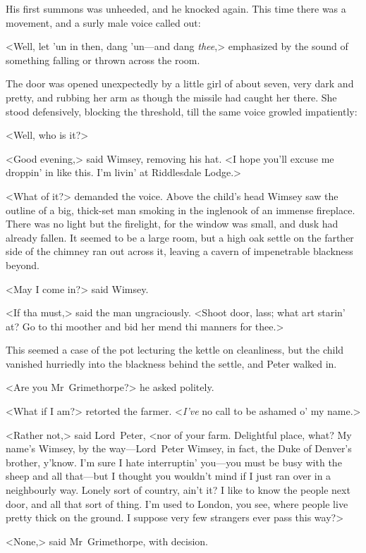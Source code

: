 His first summons was unheeded, and he knocked again. This time there was a movement, and a surly male voice called out:

<Well, let 'un in then, dang 'un—and dang \emph{thee},> emphasized by the sound of something falling or thrown across the room.

The door was opened unexpectedly by a little girl of about seven, very dark and pretty, and rubbing her arm as though the missile had caught her there. She stood defensively, blocking the threshold, till the same voice growled impatiently:

<Well, who is it?>

<Good evening,> said Wimsey, removing his hat. <I hope you'll excuse me droppin' in like this. I'm livin' at Riddlesdale Lodge.>

<What of it?> demanded the voice. Above the child's head Wimsey saw the outline of a big, thick-set man smoking in the inglenook of an immense fireplace. There was no light but the firelight, for the window was small, and dusk had already fallen. It seemed to be a large room, but a high oak settle on the farther side of the chimney ran out across it, leaving a cavern of impenetrable blackness beyond.

<May I come in?> said Wimsey.

<If tha must,> said the man ungraciously. <Shoot door, lass; what art starin' at? Go to thi moother and bid her mend thi manners for thee.>

This seemed a case of the pot lecturing the kettle on cleanliness, but the child vanished hurriedly into the blackness behind the settle, and Peter walked in.

<Are you Mr~Grimethorpe?> he asked politely.

<What if I am?> retorted the farmer. <\emph{I've} no call to be ashamed o' my name.>

<Rather not,> said Lord~Peter, <nor of your farm. Delightful place, what? My name's Wimsey, by the way—Lord~Peter Wimsey, in fact, the Duke of Denver's brother, y'know. I'm sure I hate interruptin' you—you must be busy with the sheep and all that—but I thought you wouldn't mind if I just ran over in a neighbourly way. Lonely sort of country, ain't it? I like to know the people next door, and all that sort of thing. I'm used to London, you see, where people live pretty thick on the ground. I suppose very few strangers ever pass this way?>

<None,> said Mr~Grimethorpe, with decision.

